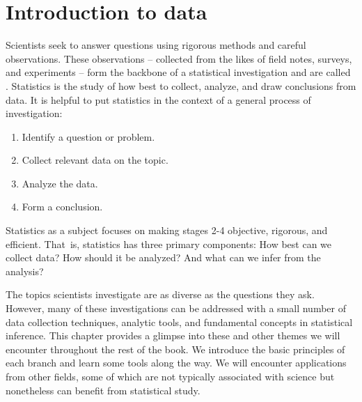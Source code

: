 \chapter{Introduction to data}
\label{introductionToData}
\label{ch_intro_to_data}
\renewcommand{\chapterfolder}{ch_intro_to_data}


Scientists seek to answer questions using rigorous methods and careful observations. These observations -- collected from the likes of field notes, surveys, and experiments -- form the backbone of a statistical investigation and are called . Statistics is the study of how best to collect, analyze, and draw conclusions from data. It is helpful to put statistics in the context of a general process of investigation:
\begin{enumerate}
\setlength{\itemsep}{0mm}
\item Identify a question or problem.
\item Collect relevant data on the topic.
\item Analyze the data.
\item Form a conclusion.
\end{enumerate}
Statistics as a subject focuses on making stages 2-4 objective, rigorous, and efficient. That~is, statistics has three primary components: How best can we collect data? How should it be analyzed? And what can we infer from the analysis?

The topics scientists investigate are as diverse as the questions they ask. However, many of these investigations can be addressed with a small number of data collection techniques, analytic tools, and fundamental concepts in statistical inference. This chapter provides a glimpse into these and other themes we will encounter throughout the rest of the book. We introduce the basic principles of each branch and learn some tools along the way. We will encounter applications from other fields, some of which are not typically associated with science but nonetheless can benefit from statistical study.

